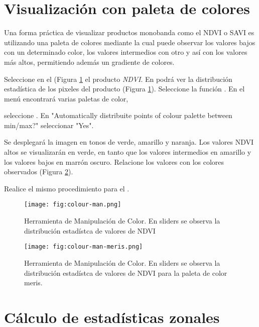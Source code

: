 \section{Visualización con paleta de colores}

Una forma práctica de visualizar productos monobanda como el NDVI o SAVI es utilizando una paleta de colores mediante la cual puede observar los valores bajos con un determinado color, los valores intermedios con otro y así con los valores más altos, permitiendo además un gradiente de colores. %

Seleccione en el  (Figura \ref{fig:color-man} el producto \emph{NDVI}. En  podrá ver la distribución estadística de los pixeles del producto (Figura \ref{fig:color-man}). Seleccione la función . En el menú encontrará varias paletas de color, 

seleccione  . En "Automatically distribuite points of colour palette between min/max?" seleccionar "Yes".

Se desplegará la imagen en tonos de verde, amarillo y naranja. Los valores NDVI altos se visualizarán en verde, en tanto que los valores intermedios en amarillo y los valores bajos en marrón oscuro. Relacione los valores con los colores observados (Figura \ref{fig:color-man-meris}).

Realice el mismo procedimiento para el .

\begin{figure}[h!]
    \centering
    \texttt{[image: fig:colour-man.png]}
    \caption{Herramienta de Manipulación de Color. En sliders se observa la distribución estadístca de valores de NDVI}
    \label{fig:color-man}
\end{figure}

\begin{figure}[h!]
    \centering
    \texttt{[image: fig:colour-man-meris.png]}
    \caption{Herramienta de Manipulación de Color. En sliders se observa la distribución estadístca de valores de NDVI para la paleta de color meris.}
    \label{fig:color-man-meris}
\end{figure}

\section{Cálculo de estadísticas zonales}

